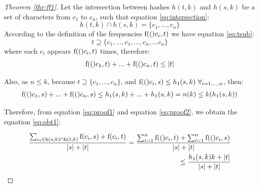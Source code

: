 
\begin{proof}[Theorem \ref{thr:ff1}]
	Let the intersection between hashes $h(t,k)$ and $h(s,k)$ be a set of characters from $c_1$ to $c_n$, such that equation \ref{eq:intersection}: 
	\begin{equation} \label{eq:intersection}
	h(t,k) \cap h(s,k)=\{c_1,...,c_n\}
	\end{equation}
	According to the definition of the frequencies $\textnormal{f}(()c_i, t)$ we have equation \ref{eq:tsub}: 
	\begin{equation} \label{eq:tsub}
	t \supseteq \{c_1,...,c_1,...,c_n,...c_n\}
	\end{equation}
	where each $c_i$ appears $\textnormal{f}(()c_i,t)$ times,  
	therefore: 
	\begin{equation} \label{eq:proof1}
	\textnormal{f}(()c_1,t) + ... + \textnormal{f}(()c_n, t) \leq |t|
	\end{equation}
	
	\noindent	Also, as $n \leq k$, because $t \supseteq \{c_1,...,c_n\}$, and $\textnormal{f}(()c_i,s) \leq h_1(s,k)~ \forall_ {i=1,...,n}$, then: 
	\begin{equation} \label{eq:proof2}
	\begin{split}
	\textnormal{f}(()c_1,s) + ... + \textnormal{f}(()c_n,s) \leq h_1(s,k) + ... + h_1(s,k)
	=n (k) \leq k (h_1(s,k))
	\end{split}
	\end{equation}
	
	Therefore, from equation \ref{eq:proof1} and equation \ref{eq:proof2}, we obtain the equation \ref{eq:obt1}:
	
	\begin{equation} \label{eq:obt1}
	\begin{split}
	\frac
	{\sum_{c_i \in \textnormal{h}(s,k) \cap \textnormal{h}(t,k)} \textnormal{f}(c_i,s)+\textnormal{f}(c_i,t)}
	{|s|+|t|}
	=\frac
	{\sum_{i=1}^n \textnormal{f}(()c_i,t) + \sum_{i=1}^n \textnormal{f}(()c_i,s)}
	{|s|+|t|} \\
	\leq \frac{h_1(s,k) k + |t|}{|s| + |t|} 
	\end{split}
	\end{equation}


\end{proof}
